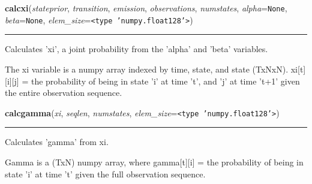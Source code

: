     \vspace{0.5ex}

\hspace{.8\funcindent}\begin{boxedminipage}{\funcwidth}

    \raggedright \textbf{calcxi}(\textit{stateprior}, \textit{transition}, \textit{emission}, \textit{observations}, \textit{numstates}, \textit{alpha}={\tt None}, \textit{beta}={\tt None}, \textit{elem\_size}={\tt {\textless}type 'numpy.float128'{\textgreater}})

    \vspace{-1.5ex}

    \rule{\textwidth}{0.5\fboxrule}
\setlength{\parskip}{2ex}
    Calculates 'xi', a joint probability from the 'alpha' and 'beta' 
    variables.

    The xi variable is a numpy array indexed by time, state, and state 
    (TxNxN). xi[t][i][j] = the probability of being in state 'i' at time 
    't', and 'j' at time 't+1' given the entire observation sequence.

\setlength{\parskip}{1ex}
    \end{boxedminipage}

    \label{QSTK:qstklearn:hmm:calcgamma}

    \vspace{0.5ex}

\hspace{.8\funcindent}\begin{boxedminipage}{\funcwidth}

    \raggedright \textbf{calcgamma}(\textit{xi}, \textit{seqlen}, \textit{numstates}, \textit{elem\_size}={\tt {\textless}type 'numpy.float128'{\textgreater}})

    \vspace{-1.5ex}

    \rule{\textwidth}{0.5\fboxrule}
\setlength{\parskip}{2ex}
    Calculates 'gamma' from xi.

    Gamma is a (TxN) numpy array, where gamma[t][i] = the probability of 
    being in state 'i' at time 't' given the full observation sequence.

\setlength{\parskip}{1ex}
    \end{boxedminipage}

    \label{QSTK:qstklearn:hmm:baumwelchstep}

